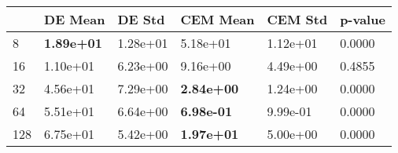 \begin{tabular}{llllll}
\toprule
{} &            DE Mean &    DE Std &           CEM Mean &   CEM Std & p-value \\
\midrule
8   &  \textbf{1.89e+01} &  1.28e+01 &           5.18e+01 &  1.12e+01 &  0.0000 \\
16  &           1.10e+01 &  6.23e+00 &           9.16e+00 &  4.49e+00 &  0.4855 \\
32  &           4.56e+01 &  7.29e+00 &  \textbf{2.84e+00} &  1.24e+00 &  0.0000 \\
64  &           5.51e+01 &  6.64e+00 &  \textbf{6.98e-01} &  9.99e-01 &  0.0000 \\
128 &           6.75e+01 &  5.42e+00 &  \textbf{1.97e+01} &  5.00e+00 &  0.0000 \\
\bottomrule
\end{tabular}
